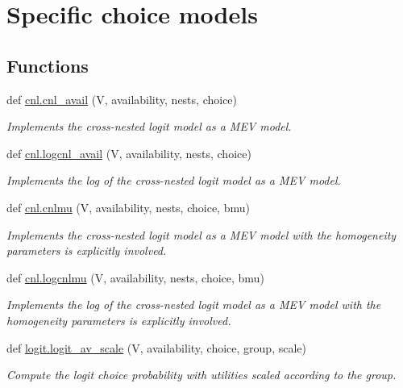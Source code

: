 \hypertarget{group__models}{}\section{Specific choice models}
\label{group__models}
\subsection*{Functions}
\begin{DoxyCompactItemize}
\item 
def \hyperlink{group__models_gaad071c762f25d4397d5d3f0012e24ae0}{cnl.\+cnl\+\_\+avail} (V, availability, nests, choice)
\begin{DoxyCompactList}\small\item\em Implements the cross-\/nested logit model as a M\+EV model. \end{DoxyCompactList}\item 
def \hyperlink{group__models_gaf4bfbebdcae30855bdc625a6d5469cf2}{cnl.\+logcnl\+\_\+avail} (V, availability, nests, choice)
\begin{DoxyCompactList}\small\item\em Implements the log of the cross-\/nested logit model as a M\+EV model. \end{DoxyCompactList}\item 
def \hyperlink{group__models_gaec0022b0d3469608fc369f92f47604e3}{cnl.\+cnlmu} (V, availability, nests, choice, bmu)
\begin{DoxyCompactList}\small\item\em Implements the cross-\/nested logit model as a M\+EV model with the homogeneity parameters is explicitly involved. \end{DoxyCompactList}\item 
def \hyperlink{group__models_gafb459235bcf08258e6c4c995831dc946}{cnl.\+logcnlmu} (V, availability, nests, choice, bmu)
\begin{DoxyCompactList}\small\item\em Implements the log of the cross-\/nested logit model as a M\+EV model with the homogeneity parameters is explicitly involved. \end{DoxyCompactList}\item 
def \hyperlink{group__models_ga0db5ee301cdc92305f5f6f8e72b009fb}{logit.\+logit\+\_\+av\+\_\+scale} (V, availability, choice, group, scale)
\begin{DoxyCompactList}\small\item\em Compute the logit choice probability with utilities scaled according to the group. \end{DoxyCompactList}\item 

\end{DoxyCompactItemize}
